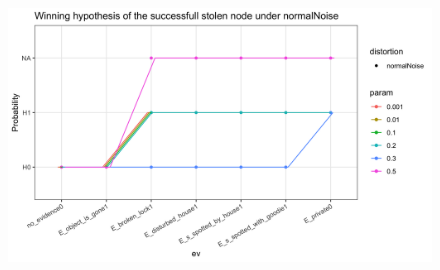 \documentclass[11pt]{amsart}
\begin{document}
\begin{figure}[htbp]
\begin{center}
\includegraphics[scale=0.17]{images/normalNoiseWeak.png}
\label{default}
\end{center}
\end{figure}
\end{document}
